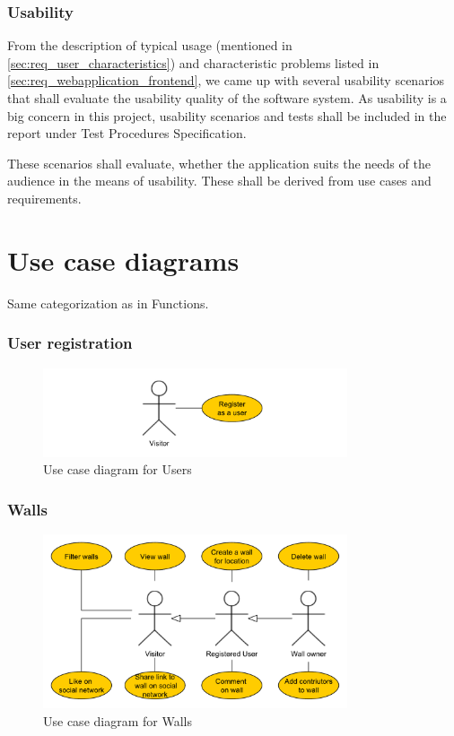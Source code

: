 \documentclass[11pt]{book}
\begin{document}
\subsubsection{Usability}\label{sec:req_usability}
From the description of typical usage (mentioned in \ref{sec:req_user_characteristics}) and characteristic problems listed in \ref{sec:req_webapplication_frontend}, we came up with several usability scenarios that shall evaluate the usability quality of the software system. As usability is a big concern in this project, usability scenarios and tests shall be included in the report under Test Procedures Specification.  %

These scenarios shall evaluate, whether the application suits the needs of the audience in the means of usability. These shall be derived from use cases and requirements.

\section{Use case diagrams}
Same categorization as in Functions. 

\subsubsection{User registration}
\begin{figure}[H]
      \centering
      \includegraphics[width=0.8\textwidth]{Figures/Requirements/user_registration.pdf}
      \caption{Use case diagram for Users}
      \label{fig:req_usecase_users}
\end{figure}

\subsubsection{Walls}
\begin{figure}[H]
      \centering
      \includegraphics[width=0.8\textwidth]{Figures/Requirements/wall.pdf}
      \caption{Use case diagram for Walls}
      \label{fig:req_usecase_walls}
\end{figure}
\end{document}
